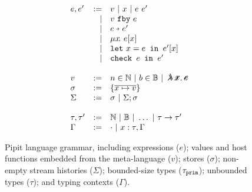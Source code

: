 \begin{figure}
  \[
  \begin{array}{lrl}
    e, e' & := & v ~|~ x ~|~ e~e' \\
          & | & \xfby{v}{e} \\
          & | & \xthen{e}{e'} \\
          & | & \xrec{x}{e[x]} \\
          & | & \xlet{x}{e}{e'[x]} \\
          & | & \xcheck{e}{e'} \\
    \\
    v & := & n \in \mathbb{N} ~|~ b \in \mathbb{B} ~|~ \mlamX
    \\
    \sigma & := & \sgl{\ov{x \mapsto v}} \\
    \Sigma & := & \sigma ~|~ \Sigma;\sigma \\
      \\
    \tau, \tau' & := & \mathbb{N} ~|~ \mathbb{B} ~|~ \hdots ~|~ \tau \to \tau' \\
    \Gamma & := & \cdot ~|~ x : \tau, \Gamma \\
    \end{array}
  \]
  \caption{Pipit language grammar, including expressions ($e$); values and host functions embedded from the \fstar{} meta-language ($v$); stores ($\sigma$); non-empty stream histories ($\Sigma$); bounded-size types ($\tau_{\texttt{prim}}$); unbounded types ($\tau$); and typing contexts ($\Gamma$).}
  \label{f:core-grammar}
\end{figure}